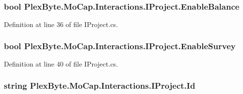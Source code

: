 \subsubsection[{\texorpdfstring{Enable\+Balance}{EnableBalance}}]{\setlength{\rightskip}{0pt plus 5cm}bool Plex\+Byte.\+Mo\+Cap.\+Interactions.\+I\+Project.\+Enable\+Balance\hspace{0.3cm}{\ttfamily [get]}}\hypertarget{interface_plex_byte_1_1_mo_cap_1_1_interactions_1_1_i_project_a28353591309223c5eb12360d6bdac936}{}\label{interface_plex_byte_1_1_mo_cap_1_1_interactions_1_1_i_project_a28353591309223c5eb12360d6bdac936}


Definition at line 36 of file I\+Project.\+cs.

\subsubsection[{\texorpdfstring{Enable\+Survey}{EnableSurvey}}]{\setlength{\rightskip}{0pt plus 5cm}bool Plex\+Byte.\+Mo\+Cap.\+Interactions.\+I\+Project.\+Enable\+Survey\hspace{0.3cm}{\ttfamily [get]}}\hypertarget{interface_plex_byte_1_1_mo_cap_1_1_interactions_1_1_i_project_a80a6ab05af2dbe0046179fa69235a42e}{}\label{interface_plex_byte_1_1_mo_cap_1_1_interactions_1_1_i_project_a80a6ab05af2dbe0046179fa69235a42e}


Definition at line 40 of file I\+Project.\+cs.

\subsubsection[{\texorpdfstring{Id}{Id}}]{\setlength{\rightskip}{0pt plus 5cm}string Plex\+Byte.\+Mo\+Cap.\+Interactions.\+I\+Project.\+Id\hspace{0.3cm}{\ttfamily [get]}}\hypertarget{interface_plex_byte_1_1_mo_cap_1_1_interactions_1_1_i_project_a95947061f781575e3df3bf6658cb86d0}{}\label{interface_plex_byte_1_1_mo_cap_1_1_interactions_1_1_i_project_a95947061f781575e3df3bf6658cb86d0}


